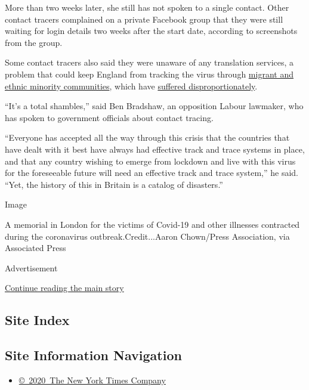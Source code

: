 More than two weeks later, she still has not spoken to a single contact.
Other contact tracers complained on a private Facebook group that they
were still waiting for login details two weeks after the start date,
according to screenshots from the group.

Some contact tracers also said they were unaware of any translation
services, a problem that could keep England from tracking the virus
through
\href{https://www.nytimes3xbfgragh.onion/2020/04/08/world/europe/coronavirus-doctors-immigrants.html}{migrant
and ethnic minority communities}, which have
\href{https://www.nytimes3xbfgragh.onion/2020/05/07/world/europe/coronavirus-uk-black-britons.html}{suffered
disproportionately}.

``It's a total shambles,'' said Ben Bradshaw, an opposition Labour
lawmaker, who has spoken to government officials about contact tracing.

``Everyone has accepted all the way through this crisis that the
countries that have dealt with it best have always had effective track
and trace systems in place, and that any country wishing to emerge from
lockdown and live with this virus for the foreseeable future will need
an effective track and trace system,'' he said. ``Yet, the history of
this in Britain is a catalog of disasters.''

Image

A memorial in London for the victims of Covid-19 and other illnesses
contracted during the coronavirus outbreak.Credit...Aaron Chown/Press
Association, via Associated Press

Advertisement

\protect\hyperlink{after-bottom}{Continue reading the main story}

\hypertarget{site-index}{%
\subsection{Site Index}\label{site-index}}

\hypertarget{site-information-navigation}{%
\subsection{Site Information
Navigation}\label{site-information-navigation}}

\begin{itemize}
\tightlist
\item
  \href{https://help.nytimes3xbfgragh.onion/hc/en-us/articles/115014792127-Copyright-notice}{©~2020~The
  New York Times Company}
\end{itemize}

